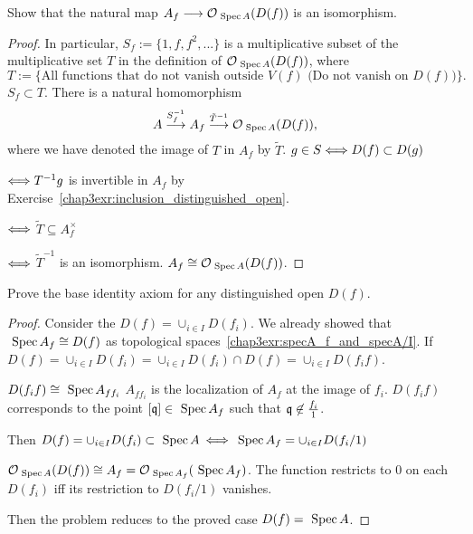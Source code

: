 \documentclass[11pt]{book} %
\begin{document}
\begin{exr}\label{chap4exr:4.1.A}
Show that the natural map $A_f \longrightarrow {\cal O}_{\text{ Spec\,} A}(D(f))$ is an isomorphism.
\end{exr}
\begin{proof}
In particular, $S_f:=\{1,f,f^2,...\}$ is a multiplicative subset of the multiplicative set $T$ in the definition of ${\cal O}_{\text{ Spec\,} A}(D(f))$, where 
$$
T:=\{\text{All functions that do not vanish outside $V(f)$ (Do not vanish on $D(f))$}\}.
$$
$S_f\subset T$.
There is a natural homomorphism 
$$
A\overset{S_f^{-1}}{\longrightarrow}A_f\overset{\tilde{T}^{-1}}{\longrightarrow}{\cal O}_{\text{ Spec\,} A}(D(f)), 
$$
where we have denoted the image of $T$ in $A_f$ by $\tilde{T}$. $g\in S\Longleftrightarrow D(f)\subset D(g)$

$\Longleftrightarrow T^{-1}g$ is invertible in $A_f$ by Exercise~\ref{chap3exr:inclusion_distinguished_open}.

$\Longleftrightarrow$ $\tilde{T}\subseteq A_f^\times$

$\Longleftrightarrow$ $\tilde{T}^{-1}$ is an isomorphism. $A_f\cong {\cal O}_{\text{ Spec\,} A}(D(f))$.
\end{proof}

\begin{exr}
Prove the base identity axiom for any distinguished open $D(f)$. 
\end{exr}
\begin{proof}
Consider the $D(f)=\cup_{i\in I}D(f_i)$. We already showed that $\text{ Spec\,} A_f\cong D(f)$ as topological spaces~\ref{chap3exr:specA_f_and_specA/I}. If $D(f)=\cup_{i\in I}D(f_i)=\cup_{i\in I}D(f_i)\cap D(f)=\cup_{i\in I}D(f_if)$.

$D(f_i f)\cong\text{ Spec\,} A_{ff_i}$ $A_{ff_i}$ is the localization of $A_f$ at the image of $f_i$. $D(f_i f)$ corresponds to the point $[\mathfrak q]\in \text{ Spec\,} A_f$ such that $\mathfrak q\not\in \frac{f_i}{1}$.

Then $D(f)=\cup_{i\in I}D(f_i)\subset \text{ Spec\,} A$ $\Longleftrightarrow$ $\text{ Spec\,} A_f=\cup_{i\in I} D(f_i/1)$

${\cal O}_{\text{ Spec\,} A}(D(f))\cong A_f={\cal O}_{\text{ Spec\,} A_f}(\text{ Spec\,} A_f)$. The function restricts to $0$ on each $D(f_i)$ iff its restriction to $D(f_i/1)$ vanishes.

Then the problem reduces to the proved case $D(f)=\text{ Spec\,} A$.
\end{proof}
\end{document}

